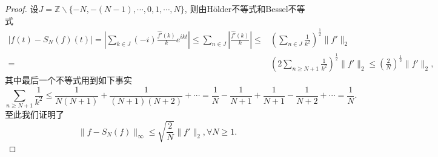\documentclass[a4paper,8pt]{ctexart}\textwidth 140mm \textheight 216mm
\newcommand{\8}{\infty}
\begin{document}
\begin{proof}
	设$J=\mathbb{Z}\backslash\{-N,-(N-1),\cdots,0,1,\cdots,N\}$, 则由H\"older不等式和Bessel不等式
	\begin{equation*}
	\begin{split}
	|f(t)-S_N(f)(t)|=|\sum_{k\in J}(-i)\frac{\hat{f'}(k)}{k}e^{ikt}|\leq \sum_{n\in J}\left|\frac{\hat{f'}(k)}{k}\right|\leq& (\sum_{n\in J}\frac{1}{k^2})^{\frac{1}{2}}\|f'\|_2\\
	=&(2\sum_{n\geq N+1}\frac{1}{k^2})^{\frac{1}{2}}\|f'\|_2\leq\left(\frac{2}{N}\right)^{\frac{1}{2}}\|f'\|_2,
	\end{split}
	\end{equation*}
	其中最后一个不等式用到如下事实
	\begin{equation*}
	\sum_{n\geq N+1}\frac{1}{k^2}\leq \frac{1}{N(N+1)}+\frac{1}{(N+1)(N+2)}+\cdots=\frac{1}{N}-\frac{1}{N+1}+\frac{1}{N+1}-\frac{1}{N+2}+\cdots=\frac{1}{N}.
	\end{equation*} 
	至此我们证明了
	$$\|f-S_N(f)\|_\infty\leq \sqrt{\frac{2}{N}}\|f'\|_2,\forall N\geq 1.$$
\end{proof}
\end{document}
